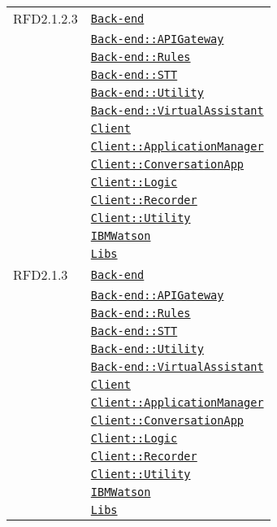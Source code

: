 \begin{longtable}{|>{\centering}m{3cm}|m{10cm}<{\centering}|}
RFD2.1.2.3 & \hyperref[Back-end]{\texttt{Back-end}}\\
& \hyperref[Back-end::APIGateway]{\texttt{Back-end::APIGateway}}\\
& \hyperref[Back-end::Rules]{\texttt{Back-end::Rules}}\\
& \hyperref[Back-end::STT]{\texttt{Back-end::STT}}\\
& \hyperref[Back-end::Utility]{\texttt{Back-end::Utility}}\\
& \hyperref[Back-end::VirtualAssistant]{\texttt{Back-end::VirtualAssistant}}\\
& \hyperref[Client]{\texttt{Client}}\\
& \hyperref[Client::ApplicationManager]{\texttt{Client::ApplicationManager}}\\
& \hyperref[Client::ConversationApp]{\texttt{Client::ConversationApp}}\\
& \hyperref[Client::Logic]{\texttt{Client::Logic}}\\
& \hyperref[Client::Recorder]{\texttt{Client::Recorder}}\\
& \hyperref[Client::Utility]{\texttt{Client::Utility}}\\
& \hyperref[IBMWatson]{\texttt{IBMWatson}}\\
& \hyperref[Libs]{\texttt{Libs}}\\ \hline

RFD2.1.3 & \hyperref[Back-end]{\texttt{Back-end}}\\
& \hyperref[Back-end::APIGateway]{\texttt{Back-end::APIGateway}}\\
& \hyperref[Back-end::Rules]{\texttt{Back-end::Rules}}\\
& \hyperref[Back-end::STT]{\texttt{Back-end::STT}}\\
& \hyperref[Back-end::Utility]{\texttt{Back-end::Utility}}\\
& \hyperref[Back-end::VirtualAssistant]{\texttt{Back-end::VirtualAssistant}}\\
& \hyperref[Client]{\texttt{Client}}\\
& \hyperref[Client::ApplicationManager]{\texttt{Client::ApplicationManager}}\\
& \hyperref[Client::ConversationApp]{\texttt{Client::ConversationApp}}\\
& \hyperref[Client::Logic]{\texttt{Client::Logic}}\\
& \hyperref[Client::Recorder]{\texttt{Client::Recorder}}\\
& \hyperref[Client::Utility]{\texttt{Client::Utility}}\\
& \hyperref[IBMWatson]{\texttt{IBMWatson}}\\
& \hyperref[Libs]{\texttt{Libs}}\\ \hline


\end{longtable}
